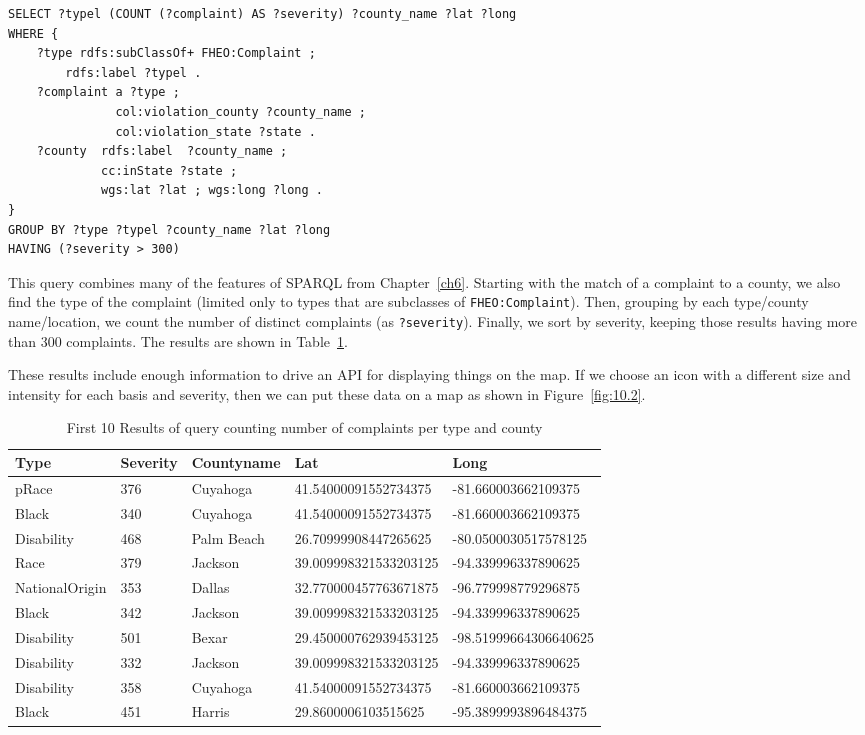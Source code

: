 \begin{lstlisting}
SELECT ?typel (COUNT (?complaint) AS ?severity) ?county_name ?lat ?long
WHERE {    
    ?type rdfs:subClassOf+ FHEO:Complaint ;
        rdfs:label ?typel .
    ?complaint a ?type ;
               col:violation_county ?county_name ;
               col:violation_state ?state .
    ?county  rdfs:label  ?county_name ;
             cc:inState ?state ;
             wgs:lat ?lat ; wgs:long ?long .
}
GROUP BY ?type ?typel ?county_name ?lat ?long
HAVING (?severity > 300)
\end{lstlisting}

This query combines many of the features of SPARQL from Chapter~\ref{ch6}.
Starting with the match of a complaint to a county, we also find the
type of the complaint (limited only to types that are subclasses of
\texttt{FHEO:Complaint}). Then, grouping by each type/county name/location, we count the
number of distinct complaints (as \texttt{?severity}). Finally, we sort by
severity, keeping those results having more than 300 complaints. The
results are shown in Table~\ref{tab:ch10.2}.

These results include enough information to drive an API for displaying
things on the map. If we choose an icon with a different size and
intensity for each basis and severity, then we can put these data on a
map as shown in Figure~\ref{fig:10.2}.

\begin{table}
\caption{First 10 Results of query counting number of complaints per type and county}
\label{tab:ch10.2}
\begin{tabular}{|lllll|}
\hline
Type&Severity&Countyname&Lat&Long\\
\hline
pRace&376&Cuyahoga&41.54000091552734375&-81.660003662109375\\
Black&340&Cuyahoga&41.54000091552734375&-81.660003662109375\\
Disability&468&Palm Beach&26.70999908447265625&-80.0500030517578125\\
Race&379&Jackson&39.009998321533203125&-94.339996337890625\\
NationalOrigin&353&Dallas&32.770000457763671875&-96.779998779296875\\
Black&342&Jackson&39.009998321533203125&-94.339996337890625\\
Disability&501&Bexar&29.450000762939453125&-98.51999664306640625\\
Disability&332&Jackson&39.009998321533203125&-94.339996337890625\\
Disability&358&Cuyahoga&41.54000091552734375&-81.660003662109375\\
Black&451&Harris&29.8600006103515625&-95.3899993896484375\\
\hline
\end{tabular}
\end{table}


